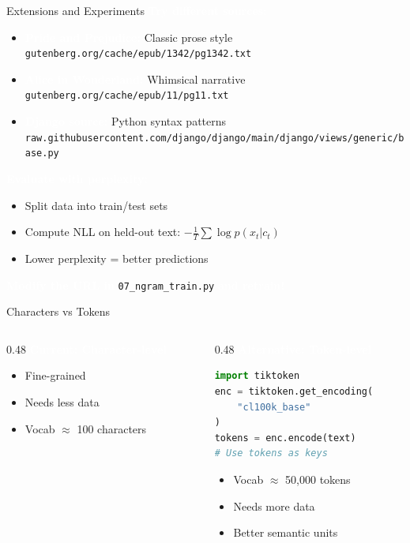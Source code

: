 \documentclass[aspectratio=169]{beamer}
\renewcommand{\textbf}[1]{\textcolor{white}{\bfseries #1}}
\begin{document}
\begin{frame}[fragile]{Extensions and Experiments}
\textbf{Try different sources:}
\begin{itemize}
    \item \textbf{Pride and Prejudice:} Classic prose style\\
    \small\texttt{gutenberg.org/cache/epub/1342/pg1342.txt}
    \item \textbf{Alice in Wonderland:} Whimsical narrative\\
    \small\texttt{gutenberg.org/cache/epub/11/pg11.txt}
    \item \textbf{Django source:} Python syntax patterns\\
    \small\texttt{raw.githubusercontent.com/django/django/main/django/views/generic/base.py}
\end{itemize}

\vspace{0.5em}
\textbf{Evaluate with perplexity:}
\begin{itemize}
    \item Split data into train/test sets
    \item Compute NLL on held-out text: $-\frac{1}{T} \sum \log p(x_t|c_t)$
    \item Lower perplexity = better predictions
\end{itemize}

\vspace{0.5em}
\textbf{Modify the URL in} \texttt{07\_ngram\_train.py} \textbf{and retrain!}
\end{frame}

\begin{frame}[fragile]{Characters vs Tokens}
\begin{columns}[T]
\begin{column}{0.48\textwidth}
\textbf{Current: Character-level}
\begin{itemize}
    \item Fine-grained
    \item Needs less data
    \item Vocab $\approx$ 100 characters
\end{itemize}
\end{column}

\begin{column}{0.48\textwidth}
\textbf{Alternative: Token-level}
\begin{lstlisting}[language=Python]
import tiktoken
enc = tiktoken.get_encoding(
    "cl100k_base"
)
tokens = enc.encode(text)
# Use tokens as keys
\end{lstlisting}
\begin{itemize}
    \item Vocab $\approx$ 50,000 tokens
    \item Needs more data
    \item Better semantic units
\end{itemize}
\end{column}
\end{columns}
\end{frame}
\end{document}
